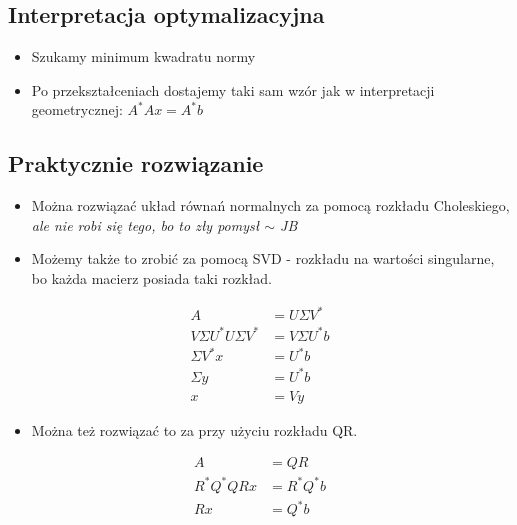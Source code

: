 \documentclass[a4paper]{article}
\begin{document}
\subsection{Interpretacja optymalizacyjna}
\begin{itemize}
    \item Szukamy minimum kwadratu normy
    \item Po przekształceniach dostajemy taki sam wzór jak w interpretacji geometrycznej: $A^* Ax=A^* b$
\end{itemize}

\subsection{Praktycznie rozwiązanie}
\begin{itemize}
    \item Można rozwiązać układ równań normalnych za pomocą rozkładu Choleskiego, \emph{ale nie robi się tego, bo to zły pomysł $\sim$ JB}
    \item Możemy także to zrobić za pomocą SVD - rozkładu na wartości singularne, bo każda macierz posiada taki rozkład.
\end{itemize}

\begin{equation*}
    \begin{split}
        A & = U \Sigma V^* \\
        V \Sigma U^* U \Sigma V^* & = V \Sigma U^*b \\
        \Sigma V^*x & = U^*b \\
        \Sigma y & = U^*b \\
        x & = Vy
    \end{split}
\end{equation*}

\begin{itemize}
    \item Można też rozwiązać to za przy użyciu rozkładu QR.
\end{itemize}

\begin{equation*}
    \begin{split}
        A & = QR \\
        R^*Q^*QRx & = R^*Q^*b \\
        Rx & = Q^* b
    \end{split}
\end{equation*}
\end{document}

